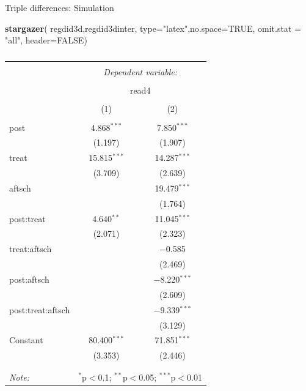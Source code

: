 \documentclass[
  ignorenonframetext,
]{beamer}
\newenvironment{Shaded}{\begin{snugshade}}{\end{snugshade}}
\newcommand{\DataTypeTok}[1]{\textcolor[rgb]{0.13,0.29,0.53}{#1}}
\newcommand{\KeywordTok}[1]{\textcolor[rgb]{0.13,0.29,0.53}{\textbf{#1}}}
\newcommand{\NormalTok}[1]{#1}
\newcommand{\OtherTok}[1]{\textcolor[rgb]{0.56,0.35,0.01}{#1}}
\newcommand{\StringTok}[1]{\textcolor[rgb]{0.31,0.60,0.02}{#1}}
\begin{document}
\begin{frame}[fragile]{Triple differences: Simulation}
\protect\hypertarget{triple-differences-simulation-3}{}
\tiny

\begin{Shaded}
\begin{Highlighting}[]
\KeywordTok{stargazer}\NormalTok{( regdid3d,regdid3dinter, }\DataTypeTok{type=}\StringTok{"latex"}\NormalTok{,}\DataTypeTok{no.space=}\OtherTok{TRUE}\NormalTok{,  }\DataTypeTok{omit.stat =} \StringTok{"all"}\NormalTok{, }\DataTypeTok{header=}\OtherTok{FALSE}\NormalTok{)}
\end{Highlighting}
\end{Shaded}

\begin{table}[!htbp] \centering 
  \caption{} 
  \label{} 
\begin{tabular}{@{\extracolsep{5pt}}lcc} 
\\[-1.8ex]\hline 
\hline \\[-1.8ex] 
 & \multicolumn{2}{c}{\textit{Dependent variable:}} \\ 
\cline{2-3} 
\\[-1.8ex] & \multicolumn{2}{c}{read4} \\ 
\\[-1.8ex] & (1) & (2)\\ 
\hline \\[-1.8ex] 
 post & 4.868$^{***}$ & 7.850$^{***}$ \\ 
  & (1.197) & (1.907) \\ 
  treat & 15.815$^{***}$ & 14.287$^{***}$ \\ 
  & (3.709) & (2.639) \\ 
  aftsch &  & 19.479$^{***}$ \\ 
  &  & (1.764) \\ 
  post:treat & 4.640$^{**}$ & 11.045$^{***}$ \\ 
  & (2.071) & (2.323) \\ 
  treat:aftsch &  & $-$0.585 \\ 
  &  & (2.469) \\ 
  post:aftsch &  & $-$8.220$^{***}$ \\ 
  &  & (2.609) \\ 
  post:treat:aftsch &  & $-$9.339$^{***}$ \\ 
  &  & (3.129) \\ 
  Constant & 80.400$^{***}$ & 71.851$^{***}$ \\ 
  & (3.353) & (2.446) \\ 
 \hline \\[-1.8ex] 
\hline 
\hline \\[-1.8ex] 
\textit{Note:}  & \multicolumn{2}{r}{$^{*}$p$<$0.1; $^{**}$p$<$0.05; $^{***}$p$<$0.01} \\ 
\end{tabular} 
\end{table}
\end{frame}
\end{document}
